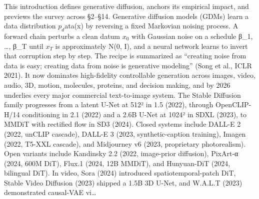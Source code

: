 This introduction defines generative diffusion, anchors its empirical impact, and previews the survey across §2--§14. Generative diffusion models (GDMs) learn a data distribution \(p_d\)ata(x) by reversing a fixed Markovian noising process. A forward chain perturbs a clean datum \(x_0\) with Gaussian noise on a schedule β\_1, \ldots, β\_T until \(x_T\) is approximately N(0, I), and a neural network learns to invert that corruption step by step. The recipe is summarized as ``creating noise from data is easy; creating data from noise is generative modeling'' (Song et al., ICLR 2021). It now dominates high-fidelity controllable generation across images, video, audio, 3D, motion, molecules, proteins, and decision making, and by 2026 underlies every major commercial text-to-image system. The Stable Diffusion family progresses from a latent U-Net at 512² in 1.5 (2022), through OpenCLIP-H/14 conditioning in 2.1 (2022) and a 2.6B U-Net at 1024² in SDXL (2023), to MMDiT with rectified flow in SD3 (2024). Closed systems include DALL-E 2 (2022, unCLIP cascade), DALL-E 3 (2023, synthetic-caption training), Imagen (2022, T5-XXL cascade), and Midjourney v6 (2023, proprietary photorealism). Open variants include Kandinsky 2.2 (2022, image-prior diffusion), PixArt-α (2024, 600M DiT), Flux.1 (2024, 12B MMDiT), and Hunyuan-DiT (2024, bilingual DiT). In video, Sora (2024) introduced spatiotemporal-patch DiT, Stable Video Diffusion (2023) shipped a 1.5B 3D U-Net, and W.A.L.T (2023) demonstrated causal-VAE vi\ldots{}
